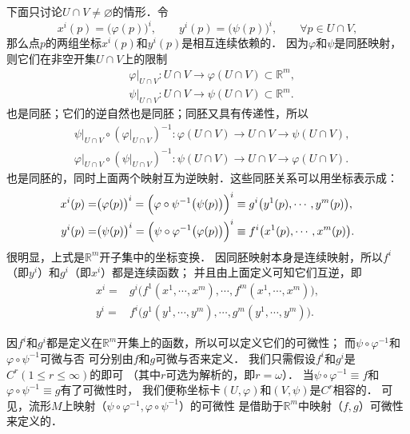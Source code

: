 下面只讨论$U \cap V \neq \varnothing$的情形．令
\begin{equation}
    x^i(p)=\bigl(\varphi(p)\bigr)^i, \qquad
    y^i(p)=\bigl(\psi(p)\bigr)^i, \qquad 
    \forall p \in U \cap V ,
\end{equation}
那么点$p$的两组坐标$x^i(p)$和$y^i(p)$是相互连续依赖的．
因为$\varphi$和$\psi$是同胚映射，
则它们在非空开集$U \cap V$上的限制
\begin{align*}
    &\left. \varphi \right | _{U \cap V} :{U \cap V} \to \varphi ({U \cap V}) \subset \mathbb{R}^m , \\ 
    &\left. \psi \right | _{U \cap V} :{U \cap V} \to \psi ({U \cap V}) \subset \mathbb{R}^m .
\end{align*}
也是同胚；它们的逆自然也是同胚；同胚又具有传递性，所以
\begin{align*}
    &\left. \psi \right | _{U \cap V} \circ (\left. \varphi \right | _{U \cap V} )^{-1}
       :\varphi({U \cap V}) \to {U \cap V} \to \psi ({U \cap V}) , \\ 
    &\left. \varphi \right | _{U \cap V} \circ (\left. \psi \right | _{U \cap V} )^{-1}
       :\psi({U \cap V}) \to {U \cap V} \to \varphi({U \cap V}) .
\end{align*}
也是同胚的，同时上面两个映射互为逆映射．这些同胚关系可以用坐标表示成：
\begin{align}
    x^i(p)=&\bigl(\varphi(p)\bigr)^i = \Bigl(\varphi \circ \psi^{-1} \bigl(\psi(p)\bigr)\Bigr)^i
      \equiv g^i\bigl( y^1(p),\cdots, y^m(p) \bigr) ,  \\
    y^i(p)=&\bigl(\psi(p)\bigr)^i = \Bigl( \psi \circ \varphi^{-1}\bigl(\varphi(p)\bigr)\Bigr)^i 
      \equiv f^i\bigl( x^1(p),\cdots, x^m(p)\bigr) .
\end{align}
很明显，上式是$\mathbb{R}^m$开子集中的坐标变换．
因同胚映射本身是连续映射，所以$f^i$（即$y^i$）和$g^i$（即$x^i$）都是连续函数；
并且由上面定义可知它们互逆，即
\begin{align}
    x^i=& g^i\bigl( f^1(x^1,\cdots,x^m),\cdots, f^m(x^1,\cdots,x^m) \bigr) ,  \\
    y^i=& f^i\bigl( g^1(y^1,\cdots,y^m),\cdots, g^m(y^1,\cdots,y^m)\bigr) .
\end{align}

因$f^i$和$g^i$都是定义在$\mathbb{R}^m$开集上的函数，所以可以定义它们的可微性；
而$\psi \circ \varphi^{-1}$和$\varphi \circ \psi^{-1} $可微与否
可分别由$f$和$g$可微与否来定义．
我们只需假设$f^i$和$g^i$是$C^r(1\leqslant r \leqslant \infty)$的即可
（其中$r$可选为解析的，即$r=\omega$）．
当$\psi \circ \varphi^{-1}\equiv f$和$\varphi \circ \psi^{-1}\equiv g $有了可微性时，
我们便称坐标卡$(U,\varphi)$和$(V,\psi)$是$C^r${\kaishu 相容的}．
可见，流形$M$上映射（$\psi\circ\varphi^{-1},\varphi\circ\psi^{-1}$）的可微性
是借助于$\mathbb{R}^m$中映射（$f,g$）可微性来定义的．

